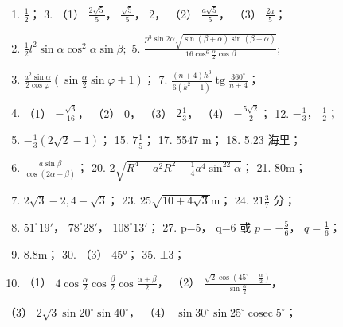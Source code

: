 \begin{enumerate}[start=2]
\item
  \(\frac{1}{2}\)； 3. （1） \(\frac{2\sqrt{5}}{5}\)，
  \(\frac{\sqrt{5}}{5}\)， 2， （2） \(\frac{a\sqrt{5}}{5}\)， （3）
  \(\frac{2a}{5}\)；
\item
  \(\frac{1}{2} l^2\sin \alpha \cos^2\alpha \sin \beta;\) 5.
  \(\frac{p^3\sin 2\alpha\sqrt{\sin(\beta + \alpha)\sin(\beta - \alpha)}}{16\cos^6\frac{\alpha}{2}\cos\beta};\)
\item
  \(\frac{a^2\sin\alpha}{2\cos\varphi}\left(\sin\frac{\alpha}{2}\sin\varphi+1\right)\)；
  7.
  \(\frac{(n+4)h^3}{6(k^2-1)}\operatorname{tg}\frac{360^\circ}{n+4}\)；
\item
  （1） \(-\frac{\sqrt{3}}{16}\)， （2） 0， （3） \(2\frac{1}{3}\)，
  （4） \(-\frac{5\sqrt{2}}{2}\)； 12. \(-\frac{1}{3}\)，
  \(\frac{1}{2}\)；
\item
  \(-\frac{1}{3}(2\sqrt{2}-1)\)； 15. \(7\frac{1}{5}\)； 17. 5547 m；
  18. 5.23 海里；
\item
  \(\frac{a\sin\beta}{\cos(2\alpha+\beta)}\)； 20.
  \(2\sqrt{R^4-a^2R^2-\frac{1}{4}a^4\sin^22\alpha}\)； 21.
  \(80\mathrm{m}\)；
\item
  \(2\sqrt{3} - 2, 4 - \sqrt{3}\)； 23.
  \(25\sqrt{10 + 4\sqrt{3}}\mathrm{m}\)； 24. \(21\frac{3}{7}\) 分；
\item
  \(51^{\circ}19'\)， \(78^{\circ}28'\)， \(108^{\circ}13'\)； 27. p=5，
  q=6 或 \(p=-\frac{5}{6}\)， \(q=\frac{1}{6}\)；
\item
  8.8m； 30. （3） 45°； 35. ±3；
\item
  （1）
  \(4\cos \frac{\alpha}{2}\cos \frac{\beta}{2}\cos \frac{\alpha + \beta}{2}\)，
  （2）
  \(\frac{\sqrt{2}\cos\left(45^{\circ} - \frac{\alpha}{2}\right)}{\sin\frac{\alpha}{2}}\)，
\end{enumerate}

（3） \(2\sqrt{3}\sin 20^{\circ}\sin 40^{\circ}\)， （4）
\(\sin 30^{\circ}\sin 25^{\circ}\operatorname{cosec}5^{\circ}\)；

